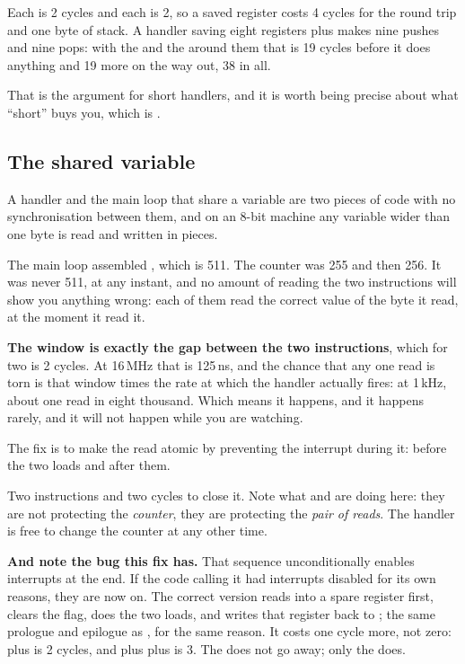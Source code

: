 Each  is 2 cycles and each  is 2, so a saved register costs 4 cycles for the
round trip and one byte of stack. A handler saving eight registers plus  makes nine
pushes and nine pops: with the  and the  around them that is 19 cycles before it
does anything and 19 more on the way out, 38 in all.

That is the argument for short handlers, and it is worth being precise about what ``short'' buys
you, which is .

\subsection{The shared variable}
\label{c3:sec:shared}
A handler and the main loop that share a variable are two pieces of code with no synchronisation
between them, and on an 8-bit machine any variable wider than one byte is read and written in
pieces.


The main loop assembled , which is 511. The counter was 255 and then 256. It was never
511, at any instant, and no amount of reading the two  instructions will show you
anything wrong: each of them read the correct value of the byte it read, at the moment it read it.

\textbf{The window is exactly the gap between the two instructions}, which for two  is 2
cycles. At 16\,MHz that is 125\,ns, and the chance that any one read is torn is that window times
the rate at which the handler actually fires: at 1\,kHz, about one read in eight thousand. Which
means it happens, and it happens rarely, and it will not happen while you are watching.

The fix is to make the read atomic by preventing the interrupt during it:  before the two
loads and  after them.

Two instructions and two cycles to close it. Note what  and  are doing here:
they are not protecting the \emph{counter}, they are protecting the \emph{pair of reads}. The
handler is free to change the counter at any other time.

\textbf{And note the bug this fix has.} That sequence unconditionally enables interrupts at the
end. If the code calling it had interrupts disabled for its own reasons, they are now on. The
correct version reads  into a spare register first, clears the flag, does the two loads,
and writes that register back to ; the same prologue and epilogue as
, for the same reason. It costs one cycle more, not zero:  plus
 is 2 cycles, and  plus  plus  is 3. The  does not
go away; only the  does.

